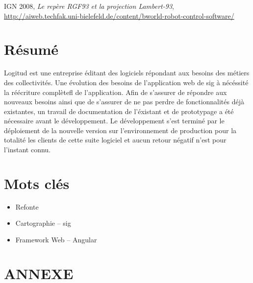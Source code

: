 \documentclass{rapportUHA40}
\begin{document}
\newpage
\printglossaries{}
\begin{thebibliography}{9}
  IGN 2008, \emph{Le repère RGF93 et la projection Lambert-93}, \url{http://aiweb.techfak.uni-bielefeld.de/content/bworld-robot-control-software/}
\end{thebibliography}
\newpage

\section*{Résumé}

Logitud est une entreprise éditant des logiciels répondant aux besoins des
métiers des collectivités. Une évolution des besoins de l'application web de
\gls{sig} à nécéssité la réécriture complèteﬂ de l'application. Afin de
s'assurer de répondre aux nouveaux besoins ainsi que de s'assurer de ne pas
perdre de fonctionnalités déjà existantes, un travail de documentation de
l'éxistant et de prototypage a été nécessaire avant le développement. Le
développement s'est terminé par le déploiement de la nouvelle version sur
l'environnement de production pour la totalité les clients de cette suite
logiciel et aucun retour négatif n'est pour l'instant connu.

\section*{Mots clés}
\begin{itemize}
  \item Refonte
  \item Cartographie – \gls{sig}
  \item Framework Web – Angular
\end{itemize}

\clearpage
\appendix
{}
\section*{ANNEXE}
\end{document}
